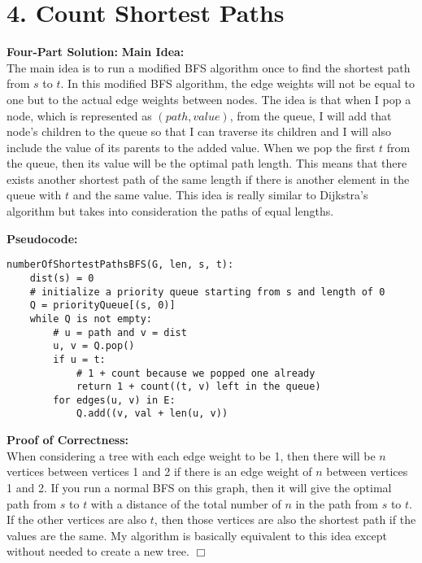 \documentclass[11pt]{article}
\def\endproofmark{$\Box$}
\newenvironment{FourPartSolution}{\par{\bf Four-Part Solution:}}{\smallskip}
\newenvironment{mainIdea}{{\bf Main Idea:}}{\smallskip}
\newenvironment{pseudocode}{\par{\bf Pseudocode:}}{\smallskip}
\newenvironment{proofOfCorrectness}{\par{\bf Proof of Correctness:}}{\endproofmark\smallskip}
\begin{document}
\section*{4. Count Shortest Paths}
\begin{FourPartSolution}
\begin{mainIdea}
\\
The main idea is to run a modified BFS algorithm once to find the shortest path from $s$ to $t$. In this modified BFS algorithm, the edge weights will not be equal to one but to the actual edge weights between nodes. The idea is that when I pop a node, which is represented as $(path, value)$, from the queue, I will add that node's children to the queue so that I can traverse its children and I will also include the value of its parents to the added value. When we pop the first $t$ from the queue, then its value will be the optimal path length. This means that there exists another shortest path of the same length if there is another element in the queue with $t$ and the same value. This idea is really similar to Dijkstra's algorithm but takes into consideration the paths of equal lengths.
\end{mainIdea}
\\
\begin{pseudocode}
\begin{lstlisting}
numberOfShortestPathsBFS(G, len, s, t):
	dist(s) = 0
	# initialize a priority queue starting from s and length of 0
	Q = priorityQueue[(s, 0)]
	while Q is not empty:
		# u = path and v = dist
		u, v = Q.pop()
		if u = t:
			# 1 + count because we popped one already
			return 1 + count((t, v) left in the queue)
		for edges(u, v) in E:
			Q.add((v, val + len(u, v))
\end{lstlisting}
\end{pseudocode}
\begin{proofOfCorrectness}
\\
When considering a tree with each edge weight to be 1, then there will be $n$ vertices between vertices 1 and 2 if there is an edge weight of $n$ between vertices 1 and 2. If you run a normal BFS on this graph, then it will give the optimal path from $s$ to $t$ with a distance of the total number of $n$ in the path from $s$ to $t$. If the other vertices are also $t$, then those vertices are also the shortest path if the values are the same. My algorithm is basically equivalent to this idea except without needed to create a new tree.
\end{proofOfCorrectness}
\\

\end{FourPartSolution}
\end{document}
